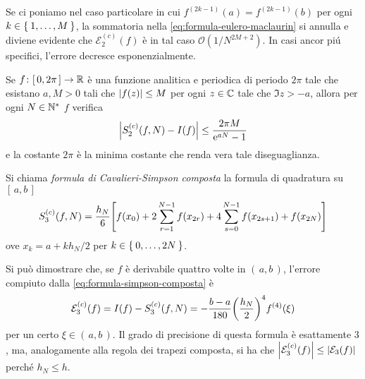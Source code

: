 	Se ci poniamo nel caso particolare in cui \(f^{(2 k -1)} (a) = f^{(2 k - 1)} (b)\) per ogni \(k \in \Set{1, \dots, M}\), la sommatoria nella \eqref{eq:formula-eulero-maclaurin} si annulla e diviene evidente che \(\mathcal{E}_2^{(c)} (f)\) è in tal caso \(\mathcal{O} (1 / N^{2 M + 2})\). In casi ancor piú specifici, l'errore decresce esponenzialmente.
	
	\begin{teorema}
		Se \(f \colon [\, 0, 2 \pi \,] \to \mathbb{R}\) è una funzione analitica e periodica di periodo \(2 \pi\) tale che esistano \(a, M > 0\) tali che \(\abs{f (z)} \le M\) per ogni \(z \in \mathbb{C}\) tale che \(\Im z > - a\), allora per ogni \(N \in \mathbb{N}^*\) \(f\) verifica
		\begin{equation}
			\abs{S_2^{(c)} (f, N) - I (f)} \le \frac{2 \pi M}{\mathrm{e}^{a N} - 1}
		\end{equation}
		e la costante \(2 \pi\) è la minima costante che renda vera tale diseguaglianza.
	\end{teorema}

	\begin{definizione}
		Si chiama \emph{formula di Cavalieri-Simpson composta} la formula di quadratura su \([\, a, b \,]\)
		\begin{equation}\label{eq:formula-simpson-composta}
			S_3^{(c)} (f, N) = \frac{h_N}{6} \qty[f (x_0) + 2 \sum_{r = 1}^{N - 1} f (x_{2 r}) + 4 \sum_{s = 0}^{N - 1} f (x_{2 s + 1}) + f (x_{2 N})]
		\end{equation}
		ove \(x_k = a + k h_N / 2\) per \(k \in \Set{0, \dots, 2 N}\).
	\end{definizione}

	Si può dimostrare che, se \(f\) è derivabile quattro volte in \((\, a, b \,)\), l'errore compiuto dalla \eqref{eq:formula-simpson-composta} è
	\begin{equation}
		\mathcal{E}_3^{(c)} (f) = I (f) - S_3^{(c)} (f, N) = - \frac{b - a}{180} \qty(\frac{h_N}{2})^4 f^{(4)} (\xi)
	\end{equation}
	per un certo \(\xi \in (\, a, b \,)\). Il grado di precisione di questa formula è esattamente \(3\), ma, analogamente alla regola dei trapezi composta, si ha che \(\abs{\mathcal{E}_3^{(c)} (f)} \le \abs{\mathcal{E}_3 (f)}\) perché \(h_N \le h\).
	
